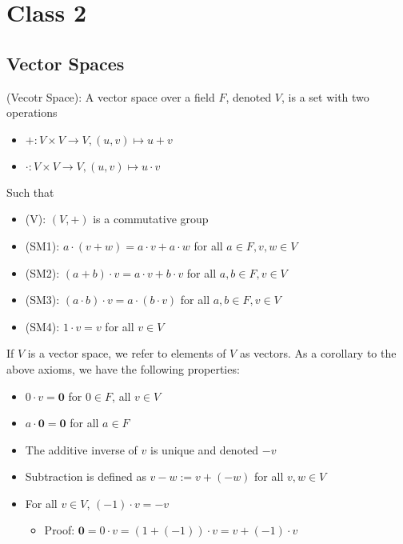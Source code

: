 \section{Class 2}

\subsection{Vector Spaces}
\begin{definition}
    (Vecotr Space): A vector space over a field $F$, denoted $V$, is a set with two operations
    \begin{itemize}
        \item $+: V \times V \to V, (u, v) \mapsto u + v$
        \item $\cdot: V \times V \to V, (u, v) \mapsto u \cdot v$
    \end{itemize}
    Such that 
    \begin{itemize}
        \item (V): $(V, +)$ is a commutative group
        \item (SM1): $a \cdot (v + w) = a\cdot v + a \cdot w$ for all $a \in F, v, w \in V$
        \item (SM2): $ (a + b) \cdot v = a\cdot v + b \cdot v$ for all $a, b \in F, v \in V$
        \item (SM3): $(a \cdot b) \cdot v = a \cdot (b \cdot v)$ for all $a, b \in F, v \in V$
        \item (SM4): $1 \cdot v = v$ for all $v \in V$
    \end{itemize}
\end{definition}

\begin{remark}
If $V$ is a vector space, we refer to elements of $V$ as vectors. As a corollary to the above axioms, we have the following properties:
\begin{itemize}
\item $0 \cdot v = \mathbf{0}$ for $0 \in F$, all $v \in V$
\item $a \cdot \mathbf{0} = \mathbf{0}$ for all $a \in F$
\item The additive inverse of $v$ is unique and denoted $-v$
\item Subtraction is defined as $v - w := v + (-w)$ for all $v, w \in V$
\item For all $v \in V$, $ (-1) \cdot v = -v$
    \begin{itemize}
        \item Proof: $\mathbf{0} = 0 \cdot v = (1 + (-1)) \cdot v = v + (-1) \cdot v$
    \end{itemize}
\end{itemize}
\end{remark}


